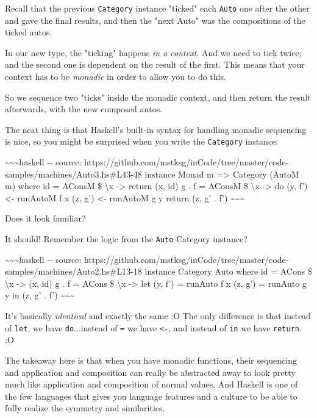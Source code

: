 \documentclass[]{article}
\begin{document}
Recall that the previous \texttt{Category} instance "ticked" each \texttt{Auto}
one after the other and gave the final results, and then the "next Auto" was the
compositions of the ticked autos.

In our new type, the "ticking" happens \emph{in a context}. And we need to tick
twice; and the second one is dependent on the result of the first. This means
that your context has to be \emph{monadic} in order to allow you to do this.

So we sequence two "ticks" inside the monadic context, and then return the
result afterwards, with the new composed autos.

The neat thing is that Haskell's built-in syntax for handling monadic sequencing
is nice, so you might be surprised when you write the \texttt{Category}
instance:

\textasciitilde{}\textasciitilde{}\textasciitilde{}haskell -\/- source:
https://github.com/mstksg/inCode/tree/master/code-samples/machines/Auto3.hs\#L43-48
instance Monad m =\textgreater{} Category (AutoM m) where id = AConsM \$
\textbackslash{}x -\textgreater{} return (x, id) g . f = AConsM \$
\textbackslash{}x -\textgreater{} do (y, f') \textless{}- runAutoM f x (z, g')
\textless{}- runAutoM g y return (z, g' . f')
\textasciitilde{}\textasciitilde{}\textasciitilde{}

Does it look familiar?

It should! Remember the logic from the \texttt{Auto} Category instance?

\textasciitilde{}\textasciitilde{}\textasciitilde{}haskell -\/- source:
https://github.com/mstksg/inCode/tree/master/code-samples/machines/Auto2.hs\#L13-18
instance Category Auto where id = ACons \$ \textbackslash{}x -\textgreater{} (x,
id) g . f = ACons \$ \textbackslash{}x -\textgreater{} let (y, f') = runAuto f x
(z, g') = runAuto g y in (z, g' . f')
\textasciitilde{}\textasciitilde{}\textasciitilde{}

It's basically \emph{identical} and exactly the same :O The only difference is
that instead of \texttt{let}, we have \texttt{do}...instead of \texttt{=} we
have \texttt{\textless{}-}, and instead of \texttt{in} we have \texttt{return}.
:O

The takeaway here is that when you have monadic functions, their sequencing and
application and composition can really be abstracted away to look pretty much
like application and composition of normal values. And Haskell is one of the few
languages that gives you language features and a culture to be able to fully
realize the symmetry and similarities.
\end{document}

